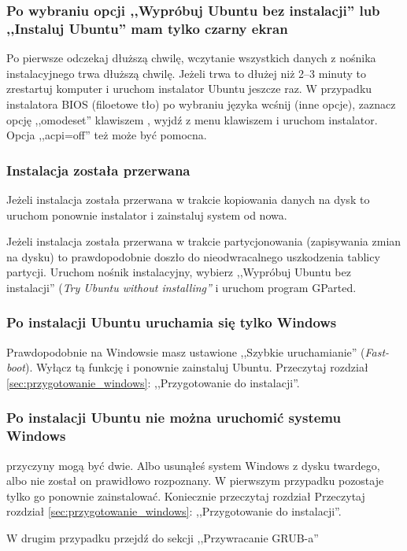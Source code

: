 \subsubsection{Po wybraniu opcji ,,Wypróbuj Ubuntu bez instalacji'' lub ,,Instaluj Ubuntu'' mam tylko czarny ekran}
Po pierwsze odczekaj dłuższą chwilę, wczytanie wszystkich danych z nośnika instalacyjnego trwa dłuższą chwilę. Jeżeli trwa to dłużej niż 2--3 minuty to zrestartuj komputer i uruchom instalator Ubuntu jeszcze raz. W przypadku instalatora BIOS (filoetowe tło) po wybraniu języka wcśnij  (inne opcje), zaznacz opcję ,,omodeset'' klawiszem \keys{\returnwin}, wyjdź z menu klawiszem  i uruchom instalator. Opcja ,,acpi=off'' też może być pomocna.

\subsubsection{Instalacja została przerwana}
Jeżeli instalacja została przerwana w trakcie kopiowania danych na dysk to uruchom ponownie instalator i zainstaluj system od nowa.

Jeżeli instalacja została przerwana w trakcie partycjonowania (zapisywania zmian na dysku) to prawdopodobnie doszło do nieodwracalnego uszkodzenia tablicy partycji. Uruchom nośnik instalacyjny, wybierz ,,Wypróbuj Ubuntu bez instalacji'' (\textit{Try Ubuntu without installing''} i uruchom program GParted.

\subsubsection{Po instalacji Ubuntu uruchamia się tylko Windows}
Prawdopodobnie na Windowsie masz ustawione ,,Szybkie uruchamianie'' (\textit{Fast-boot}). Wyłącz tą funkcję i ponownie zainstaluj Ubuntu. Przeczytaj rozdział \ref{sec:przygotowanie_windows}: ,,Przygotowanie do instalacji''.

\subsubsection{Po instalacji Ubuntu nie można uruchomić systemu Windows}
przyczyny mogą być dwie. Albo usunąłeś system Windows z dysku twardego, albo nie został on prawidłowo rozpoznany. W pierwszym przypadku pozostaje tylko go ponownie zainstalować. Koniecznie przeczytaj rozdział Przeczytaj rozdział \ref{sec:przygotowanie_windows}: ,,Przygotowanie do instalacji''.

W drugim przypadku przejdź do sekcji ,,Przywracanie GRUB-a''

